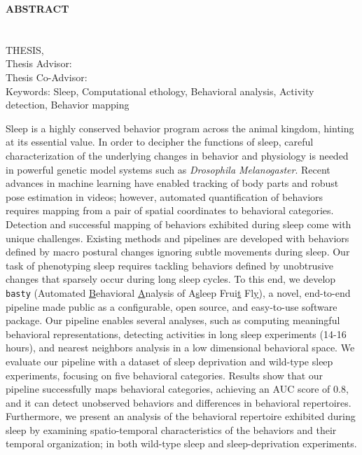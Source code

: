 \clearpage
\begin{center}
	\MakeUppercase{\textbf{Abstract}} \\ [3\baselineskip]
	\MakeUppercase{\thesistitle} \\[3\baselineskip]
	\MakeUppercase{\student} \\[\baselineskip]
	\MakeUppercase{\major \degreeabv Thesis, \month~\year} \\[\baselineskip]
	Thesis Advisor: \advisor \\
	Thesis Co-Advisor: \coadvisor \\
	[2\baselineskip]
	Keywords: Sleep, Computational ethology, Behavioral analysis, Activity detection, Behavior mapping \\[2\baselineskip]
\end{center}

\singlespacing

Sleep is a highly conserved behavior program across the animal kingdom, hinting at its essential value.
In order to decipher the functions of sleep, careful characterization of the underlying changes in behavior and physiology is needed in powerful genetic model systems such as \textit{Drosophila Melanogaster}.
Recent advances in machine learning have enabled tracking of body parts and robust pose estimation in videos; however, automated quantification of behaviors requires mapping from a pair of spatial coordinates to behavioral categories.
Detection and successful mapping of behaviors exhibited during sleep come with unique challenges.
Existing methods and pipelines are developed with behaviors defined by macro postural changes ignoring subtle movements during sleep.
Our task of phenotyping sleep requires tackling behaviors defined by unobtrusive changes that sparsely occur during long sleep cycles.
To this end, we develop \texttt{basty} (Automated \underline{B}ehavioral \underline{A}nalysis of A\underline{s}leep Frui\underline{t} Fl\underline{y}), a novel, end-to-end pipeline made public as a configurable, open source, and easy-to-use software package.
Our pipeline enables several analyses, such as computing meaningful behavioral representations, detecting activities in long sleep experiments (14-16 hours), and nearest neighbors analysis in a low dimensional behavioral space.
We evaluate our pipeline with a dataset of sleep deprivation and wild-type sleep experiments, focusing on five behavioral categories.
Results show that our pipeline successfully maps behavioral categories, achieving an AUC score of 0.8, and it can detect unobserved behaviors and differences in behavioral repertoires.
Furthermore, we present an analysis of the behavioral repertoire exhibited during sleep by examining spatio-temporal characteristics of the behaviors and their temporal organization; in both wild-type sleep and sleep-deprivation experiments.

